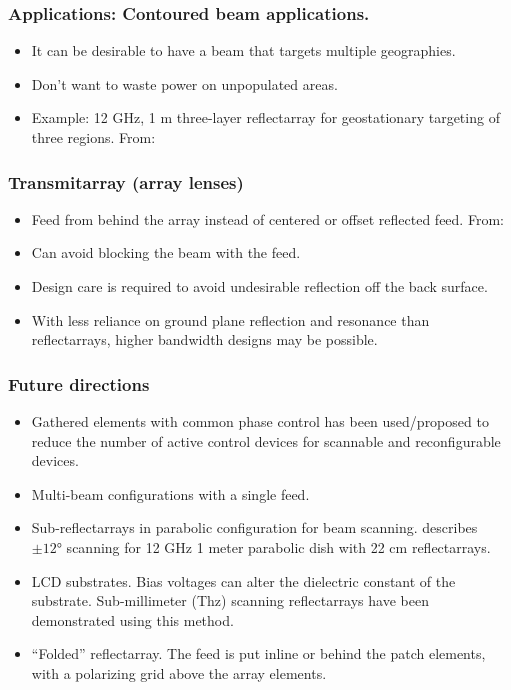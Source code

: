 \begin{frame}
\frametitle{Applications: Contoured beam applications.}

\begin{itemize}
\item It can be desirable to have a beam that targets multiple geographies.
\item Don't want to waste power on unpopulated areas.
\item Example: 12 \si{GHz}, 1 \si{m} three-layer reflectarray for geostationary targeting of three regions. From: \citep{encinar2004three}
\end{itemize}

\end{frame}


\begin{frame}
\frametitle{Transmitarray (array lenses)}
\begin{itemize}
\item Feed from behind the array instead of centered or offset reflected feed.  From: \citep{lau2012reconfigurable}
\item Can avoid blocking the beam with the feed.
\item Design care is required to avoid undesirable reflection off the back surface.
\item With less reliance on ground plane reflection and resonance than reflectarrays, higher bandwidth designs may be possible.
\end{itemize}
\end{frame}

\begin{frame}[allowframebreaks]
\frametitle{Future directions}
\begin{itemize}
\item Gathered elements with common phase control has been used/proposed to reduce the number of active control devices for scannable and reconfigurable devices.  \citep{carrasco2012recent}
\item Multi-beam configurations with a single feed. \citep{carrasco2012recent}
\item Sub-reflectarrays in parabolic configuration for beam scanning.  \citep{arrebola2010phase} describes \( \pm \ang{12} \) scanning for 12 \si{GHz} 1 meter parabolic dish with 22 \si{cm} reflectarrays.
\item LCD substrates.  Bias voltages can alter the dielectric constant of the substrate.  Sub-millimeter (\si{Thz}) scanning reflectarrays have been demonstrated using this method.
\item ``Folded'' reflectarray.  The feed is put inline or behind the patch elements, with a polarizing grid above the array elements.
\end{itemize}
\end{frame}

